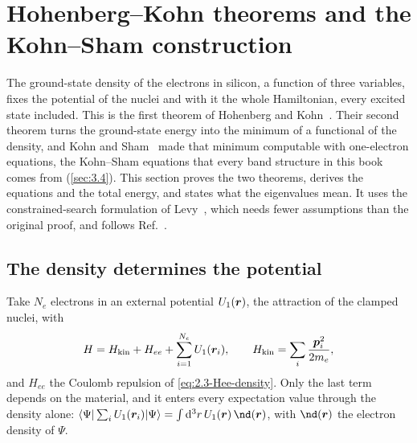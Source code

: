 \let\origsectionmark\sectionmark\renewcommand*{\sectionmark}[1]{\origsectionmark{Hohenberg--Kohn theorems and Kohn--Sham construction}}%
\section{Hohenberg--Kohn theorems and the Kohn--Sham construction}\label{app:D.5}
\let\sectionmark\origsectionmark

The ground-state density of the electrons in silicon, a function of three variables, fixes the potential of the nuclei and with it the whole Hamiltonian, every excited state included. This is the first theorem of Hohenberg and Kohn~\cite{hohenberg1964inhomogeneous}. Their second theorem turns the ground-state energy into the minimum of a functional of the density, and Kohn and Sham~\cite{kohn1965self} made that minimum computable with one-electron equations, the Kohn--Sham equations that every band structure in this book comes from (\cref{sec:3.4}). This section proves the two theorems, derives the equations and the total energy, and states what the eigenvalues mean. It uses the constrained-search formulation of Levy~\cite{levy1979universal}, which needs fewer assumptions than the original proof, and follows Ref.~\cite[Chaps.~6 and 7]{martin2004electronic}.

\subsection*{The density determines the potential}

Take $N_e$ electrons in an external potential $U_1(\bm{r})$, the attraction of the clamped nuclei, with
\begin{equation*}
  H = H_{\mathrm{kin}} + H_{ee} + \sum_{i=1}^{N_e}U_1(\bm{r}_i), \qquad H_{\mathrm{kin}} = \sum_i\frac{\bm{p}_i^2}{2m_e} ,
\end{equation*}
and $H_{ee}$ the Coulomb repulsion of \cref{eq:2.3-Hee-density}. Only the last term depends on the material, and it enters every expectation value through the density alone: $\langle\Psi|\sum_iU_1(\vect{r}_i)|\Psi\rangle = \int\dd^3r\,U_1(\vect{r})\,\nd(\vect{r})$, with $\nd(\vect{r})$ the electron density of $\Psi$.

